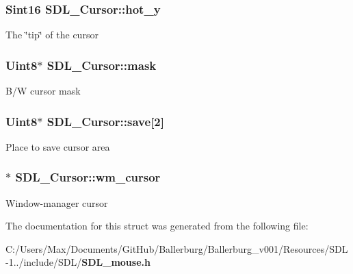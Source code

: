 \subsubsection[{hot\+\_\+y}]{\setlength{\rightskip}{0pt plus 5cm}Sint16 S\+D\+L\+\_\+\+Cursor\+::hot\+\_\+y}\label{struct_s_d_l___cursor_a154ec5999705b912aa09b1f1bacb3275}
The \char`\"{}tip\char`\"{} of the cursor 
\subsubsection[{mask}]{\setlength{\rightskip}{0pt plus 5cm}Uint8$\ast$ S\+D\+L\+\_\+\+Cursor\+::mask}\label{struct_s_d_l___cursor_afaec3f604b8a83986bab02eee024c5eb}
B/\+W cursor mask 
\subsubsection[{save}]{\setlength{\rightskip}{0pt plus 5cm}Uint8$\ast$ S\+D\+L\+\_\+\+Cursor\+::save[2]}\label{struct_s_d_l___cursor_a44a8edebf057e76e048512a57c5630e0}
Place to save cursor area 
\subsubsection[{wm\+\_\+cursor}]{$\ast$ S\+D\+L\+\_\+\+Cursor\+::wm\+\_\+cursor}\label{struct_s_d_l___cursor_ab133c48a66abe3831e5ad18467d9ef3d}
Window-\/manager cursor 

The documentation for this struct was generated from the following file\+:\begin{DoxyCompactItemize}
\item 
C\+:/\+Users/\+Max/\+Documents/\+Git\+Hub/\+Ballerburg/\+Ballerburg\+\_\+v001/\+Resources/\+S\+D\+L-\/1../include/\+S\+D\+L/{\bf S\+D\+L\+\_\+mouse.\+h}\end{DoxyCompactItemize}
